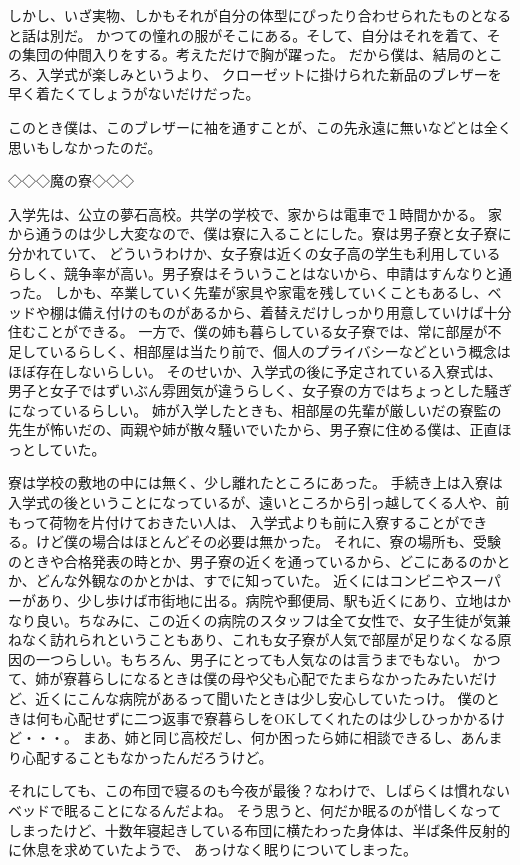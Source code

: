 しかし、いざ実物、しかもそれが自分の体型にぴったり合わせられたものとなると話は別だ。
かつての憧れの服がそこにある。そして、自分はそれを着て、その集団の仲間入りをする。考えただけで胸が躍った。
だから僕は、結局のところ、入学式が楽しみというより、
クローゼットに掛けられた新品のブレザーを早く着たくてしょうがないだけだった。

このとき僕は、このブレザーに袖を通すことが、この先永遠に無いなどとは全く思いもしなかったのだ。


◇◇◇魔の寮◇◇◇

入学先は、公立の夢石高校。共学の学校で、家からは電車で１時間かかる。
家から通うのは少し大変なので、僕は寮に入ることにした。寮は男子寮と女子寮に分かれていて、
どういうわけか、女子寮は近くの女子高の学生も利用しているらしく、競争率が高い。男子寮はそういうことはないから、申請はすんなりと通った。
しかも、卒業していく先輩が家具や家電を残していくこともあるし、ベッドや棚は備え付けのものがあるから、着替えだけしっかり用意していけば十分住むことができる。
一方で、僕の姉も暮らしている女子寮では、常に部屋が不足しているらしく、相部屋は当たり前で、個人のプライバシーなどという概念はほぼ存在しないらしい。
そのせいか、入学式の後に予定されている入寮式は、男子と女子ではずいぶん雰囲気が違うらしく、女子寮の方ではちょっとした騒ぎになっているらしい。
姉が入学したときも、相部屋の先輩が厳しいだの寮監の先生が怖いだの、両親や姉が散々騒いでいたから、男子寮に住める僕は、正直ほっとしていた。

寮は学校の敷地の中には無く、少し離れたところにあった。
手続き上は入寮は入学式の後ということになっているが、遠いところから引っ越してくる人や、前もって荷物を片付けておきたい人は、
入学式よりも前に入寮することができる。けど僕の場合はほとんどその必要は無かった。
それに、寮の場所も、受験のときや合格発表の時とか、男子寮の近くを通っているから、どこにあるのかとか、どんな外観なのかとかは、すでに知っていた。
近くにはコンビニやスーパーがあり、少し歩けば市街地に出る。病院や郵便局、駅も近くにあり、立地はかなり良い。ちなみに、この近くの病院のスタッフは全て女性で、女子生徒が気兼ねなく訪れられということもあり、これも女子寮が人気で部屋が足りなくなる原因の一つらしい。もちろん、男子にとっても人気なのは言うまでもない。
かつて、姉が寮暮らしになるときは僕の母や父も心配でたまらなかったみたいだけど、近くにこんな病院があるって聞いたときは少し安心していたっけ。
僕のときは何も心配せずに二つ返事で寮暮らしをOKしてくれたのは少しひっかかるけど・・・。
まあ、姉と同じ高校だし、何か困ったら姉に相談できるし、あんまり心配することもなかったんだろうけど。

それにしても、この布団で寝るのも今夜が最後？なわけで、しばらくは慣れないベッドで眠ることになるんだよね。
そう思うと、何だか眠るのが惜しくなってしまったけど、十数年寝起きしている布団に横たわった身体は、半ば条件反射的に休息を求めていたようで、
あっけなく眠りについてしまった。


